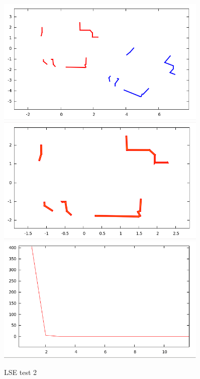 \documentclass[a4paper, onecolumn]{report}
\begin{document}
\begin{figure}[htbp]
\centering
\includegraphics[width=0.9\textwidth]{images/foto_test/-5_-0.3_0.5236/before_after.png}
\includegraphics[width=0.9\textwidth]{images/foto_test/-5_-0.3_0.5236/result.png}
\includegraphics[width=0.9\textwidth]{images/foto_test/-5_-0.3_0.5236/chi_new.png}


\caption{LSE test 2}
\end{figure}
\end{document}
